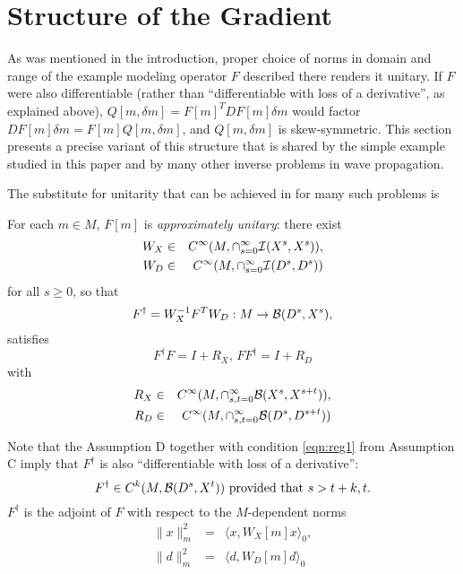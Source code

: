 \section{Structure of the Gradient}
As was mentioned in the introduction, proper choice of norms in domain
and range of the example modeling operator $F$ described there renders
it unitary. If $F$ were also differentiable (rather than
``differentiable with loss of a derivative'', as explained above),
$Q[m,\delta m] = F[m]^TDF[m]\delta m$ would factor $DF[m]\delta m =
F[m]Q[m,\delta m]$, and $Q[m,\delta m]$ is skew-symmetric. This
section presents a precise variant of this structure that is shared by
the simple example studied in this paper and by many other inverse
problems in wave propagation. 

The substitute for unitarity that can be achieved in for many such
problems is

 For each $m \in M$, $F[m]$ is
{\em approximately unitary}: there exist
\begin{eqnarray}
  W_X&\in& C^{\infty}(M,\cap_{s=0}^{\infty}{\cal I}(X^s,X^s)),\\\nonumber
  W_D&\in& C^{\infty}(M,\cap_{s=0}^{\infty}{\cal I}(D^s,D^s))
  \label{eqn:w}
\end{eqnarray}
for all $s \ge 0$, so that
\begin{equation}
\label{eqn:appinvdef}
F^{\dagger} = W_X^{-1}F^TW_D: M \rightarrow {\cal B}(D^s,X^s),
\end{equation}
satisfies
\begin{equation}
  \label{eqn:appinvprop}
  F^{\dagger}F = I +R_X,\,FF^{\dagger}=I+R_D
\end{equation}
with
\begin{eqnarray}
   R_X&\in& C^{\infty}(M,\cap_{s,t=0}^{\infty}{\cal B}(X^s,X^{s+t})),\\\nonumber
  R_D&\in& C^{\infty}(M,\cap_{s,t=0}^{\infty}{\cal B}(D^s,D^{s+t}))
  \label{eqn:r}
\end{eqnarray}

Note that the Assumption D together with condition \ref{eqn:reg1} from
Assumption C imply that $F^{\dagger}$ is also ``differentiable with loss of a derivative'':
\begin{equation}
\label{eqn:appinvderiv}
F^{\dagger} \in C^k(M, {\cal B}(D^s,X^t)) \mbox{ provided that
}s > t+k, t.
\end{equation}
$F^{\dagger}$ is the adjoint of $F$ with respect to the $M$-dependent
norms
\begin{eqnarray}
  \|x\|^2_m &=& \langle x, W_X[m]x\rangle_0,\\ \nonumber
  \|d\|^2_m &=& \langle d, W_D[m]d\rangle_0
  \label{eqn:unit}
\end{eqnarray}

